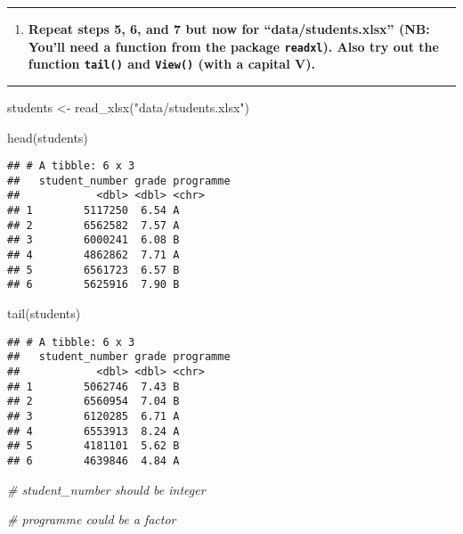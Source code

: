 \documentclass[
]{article}
\newenvironment{Shaded}{\begin{snugshade}}{\end{snugshade}}
\newcommand{\CommentTok}[1]{\textcolor[rgb]{0.56,0.35,0.01}{\textit{#1}}}
\newcommand{\FunctionTok}[1]{\textcolor[rgb]{0.00,0.00,0.00}{#1}}
\newcommand{\NormalTok}[1]{#1}
\newcommand{\OtherTok}[1]{\textcolor[rgb]{0.56,0.35,0.01}{#1}}
\newcommand{\StringTok}[1]{\textcolor[rgb]{0.31,0.60,0.02}{#1}}
\providecommand{\tightlist}{%
  \setlength{\itemsep}{0pt}\setlength{\parskip}{0pt}}
\begin{document}
\begin{center}\rule{0.5\linewidth}{0.5pt}\end{center}

\begin{enumerate}
\def\labelenumi{\arabic{enumi}.}
\setcounter{enumi}{8}
\tightlist
\item
  \textbf{Repeat steps 5, 6, and 7 but now for ``data/students.xlsx''
  (NB: You'll need a function from the package \texttt{readxl}). Also
  try out the function \texttt{tail()} and \texttt{View()} (with a
  capital V).}
\end{enumerate}

\begin{center}\rule{0.5\linewidth}{0.5pt}\end{center}

\begin{Shaded}
\begin{Highlighting}[]
\NormalTok{students }\OtherTok{\textless{}{-}} \FunctionTok{read\_xlsx}\NormalTok{(}\StringTok{"data/students.xlsx"}\NormalTok{)}

\FunctionTok{head}\NormalTok{(students)}
\end{Highlighting}
\end{Shaded}

\begin{verbatim}
## # A tibble: 6 x 3
##   student_number grade programme
##            <dbl> <dbl> <chr>    
## 1        5117250  6.54 A        
## 2        6562582  7.57 A        
## 3        6000241  6.08 B        
## 4        4862862  7.71 A        
## 5        6561723  6.57 B        
## 6        5625916  7.90 B
\end{verbatim}

\begin{Shaded}
\begin{Highlighting}[]
\FunctionTok{tail}\NormalTok{(students)}
\end{Highlighting}
\end{Shaded}

\begin{verbatim}
## # A tibble: 6 x 3
##   student_number grade programme
##            <dbl> <dbl> <chr>    
## 1        5062746  7.43 B        
## 2        6560954  7.04 B        
## 3        6120285  6.71 A        
## 4        6553913  8.24 A        
## 5        4181101  5.62 B        
## 6        4639846  4.84 A
\end{verbatim}

\begin{Shaded}
\begin{Highlighting}[]
\CommentTok{\# student\_number should be integer}

\CommentTok{\# programme could be a factor}
\end{Highlighting}
\end{Shaded}
\end{document}
